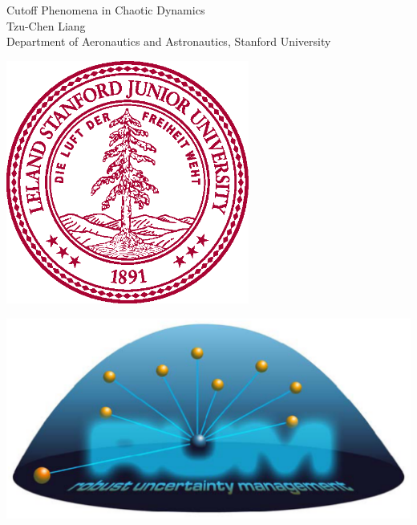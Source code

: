 \documentclass[landscape,a0b,final]{a0poster}
\newenvironment{poster}{
  \begin{center}
  \begin{minipage}[c]{0.98\textwidth}
}{
  \end{minipage} 
  \end{center}
}
\newenvironment{pcolumn}[1]{
  \begin{minipage}{#1\textwidth}
  \begin{center}
}{
  \end{center}
  \end{minipage}
}
\begin{document}
\begin{poster}
\begin{center}
\begin{pcolumn}{0.992}
{\begin{minipage}[c][4.5cm][c]{0.14\textwidth}
\begin{center}
  \end{center}
\end{minipage}
\begin{minipage}[c][9cm][c]{0.46\textwidth}
  \begin{center}
    {\sc \Huge Cutoff Phenomena in Chaotic Dynamics}\\[10mm]
    {\Large Tzu-Chen Liang\\[7.5mm]
     Department of Aeronautics and Astronautics, Stanford University }
  \end{center}
\end{minipage}
\begin{minipage}[c][4.5cm][c]{0.10\textwidth}
  \begin{center}
    \hspace{2cm}
    \includegraphics[width=8cm,angle=0]{SU_Seal_Card_pos}
  \end{center}
\end{minipage}
\begin{minipage}[c][9cm][c]{0.17\textwidth}
  \begin{center}
    \includegraphics[width=15cm,angle=0]{Dynarumlogo}
  \end{center}
\end{minipage}
} 




\end{pcolumn}
\end{center}
\end{poster}
\end{document}

